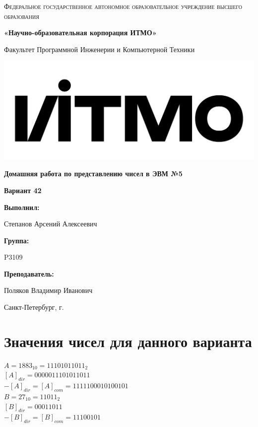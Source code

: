 \documentclass[12pt,a4paper]{report}
\begin{document}
\begin{titlepage}
	\centering
	{
        \scshape
        Федеральное государственное автономное образовательное учреждение высшего образования
        \par
        \textbf{«Научно-образовательная корпорация ИТМО»}
        \par
        \vspace*{1cm}
        Факультет Программной Инженерии и Компьютерной Техники
        \par
    }
    \vspace*{0.6cm}
    \includegraphics[width=\textwidth]{logo.png}
    {
        \Large
        \textbf{Домашняя работа по представлению чисел в ЭВМ №5}
        \par
        \normalsize
        \vspace*{0.75cm}
        \textbf{Вариант 42}
        \par
    }
    \vfill
    \hfill\begin{minipage}{\dimexpr\textwidth-7.8cm}
        \textbf{Выполнил:}\par
        Степанов Арсений Алексеевич\par
        \vspace*{0.15cm}
        \textbf{Группа:}\par
        P3109\par
        \vspace*{0.15cm}
        \textbf{Преподаватель:}\par
        Поляков Владимир Иванович\par
    \end{minipage}
    \vfill
    Санкт-Петербург, \the\year{}г.
\end{titlepage}
\section*{Значения чисел для данного варианта}
\onehalfspacing
$A=1883_{10}=11101011011_2$\\
$[A]_{dir}=0000011101011011$\\
$-[A]_{dir}=[A]_{com}=1111100010100101$\\
\hfill\break
$B=27_{10}=11011_2$\\
$[B]_{dir}=00011011$\\
$-[B]_{dir}=[B]_{com}=11100101$
\end{document}
